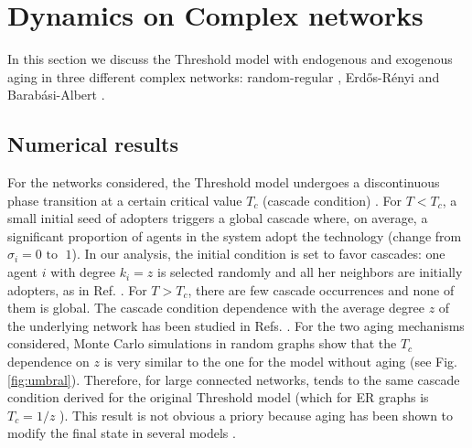 \section{\label{sec:Complex networks} Dynamics on Complex networks}

In this section we discuss the Threshold model with endogenous and exogenous aging in three different complex networks: random-regular \cite{wormald1999models}, Erd\H{o}s-R\'enyi \cite{erdos1960evolution} and Barab\'asi-Albert \cite{barabasi2009scale}.

\subsection{\label{subsec:Numerical results} Numerical results}

For the networks considered, the Threshold model undergoes a discontinuous phase transition at a certain critical value $T_{c}$ (cascade condition) \cite{watts-2002}. For $T<T_c$, a small initial seed of adopters triggers a global cascade where, on average, a significant proportion of agents in the system adopt the technology (change from $\sigma_i = 0 \mbox{ to } \; 1$). In our analysis, the initial condition is set to favor cascades: one agent $i$ with degree $k_i = z$ is selected randomly and all her neighbors are initially adopters, as in Ref. \cite{centola-2007,singh-2013}. For $T>T_c$, there are few cascade occurrences and none of them is global. The cascade condition dependence with the average degree $z$ of the underlying network has been studied in Refs. \cite{watts-2002, gleeson-2007}. For the two aging mechanisms considered, Monte Carlo simulations in random graphs show that the $T_c$ dependence on $z$ is very similar to the one for the model without aging (see Fig. \ref{fig:umbral}). Therefore, for large connected networks, tends to the same cascade condition derived for the original Threshold model (which for ER graphs is $T_{c} = 1 / z$ \cite{watts-2002}). This result is not obvious a priory because aging has been shown to modify the final state in several models \cite{fernandez-gracia-2013,artime-2018,peralta-2020C,peralta-2020A,chen-2020,fernandez-gracia-2011,perez-2016,stark-2008}. 


